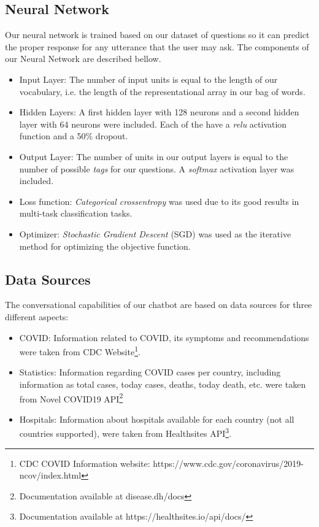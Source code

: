 \documentclass[]{article}
\begin{document}
\subsection{Neural Network}
Our neural network is trained based on our dataset of questions so it can predict the proper response for any utterance that the user may ask. The components of our Neural Network are described bellow.

\begin{itemize}
  \item{Input Layer:} The number of input units is equal to the length of our vocabulary, i.e. the length of the representational array in our bag of words.
  \item{Hidden Layers:} A first hidden layer with 128 neurons and a second hidden layer with 64 neurons were included. Each of the have a \emph{relu} activation function and a 50\% dropout.
  \item{Output Layer:} The number of units in our output layers is equal to the number of possible \emph{tags} for our questions. A \emph{softmax} activation layer was included.
  \item{Loss function:} \emph{Categorical crossentropy} was used due to its good results in multi-task classification tasks.
  \item{Optimizer:} \emph{Stochastic Gradient Descent} (SGD) was used as the iterative method for optimizing the objective function.
\end{itemize}

\subsection{Data Sources}

The conversational capabilities of our chatbot are based on data sources for three different aspects:

\begin{itemize}
  \item COVID: Information related to COVID, its symptoms and recommendations were taken from CDC Website\footnote{CDC COVID Information website: https://www.cdc.gov/coronavirus/2019-ncov/index.html}.
  \item Statistics: Information regarding COVID cases per country, including information as total cases, today cases, deaths, today death, etc. were taken from Novel COVID19 API\footnote{Documentation available at disease.dh/docs}
  \item Hospitals: Information about hospitals available for each country (not all countries supported), were taken from Healthsites API\footnote{Documentation available at https://healthsites.io/api/docs/}.
\end{itemize}
\end{document}
